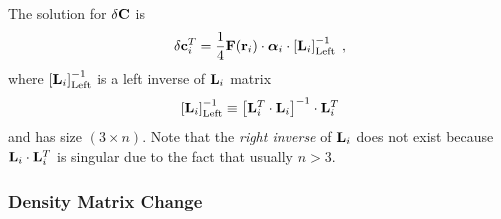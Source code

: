 \documentclass[aip,amsmath,amssymb,reprint,floatfix]{revtex4-1}
\newcommand{\BM}[1]{\bm{#1}}
\begin{document}
%
The solution for $\delta {\bf C}$ is
%
\begin{equation} \label{e:mu-ind.matrix.linear.solution}
  \delta {\bf c}_i^T = \frac{1}{4}
            {\bf F}({\bf r}_i)  \cdot {\BM{\alpha}}_i \cdot 
                    \left[ {\bf L}_i  \right]^{-1}_{\rm Left} \;,
\end{equation}
%
where $\left[ {\bf L}_i  \right]^{-1}_{\rm Left}$ is a left inverse
of ${\bf L}_i$ matrix 
%
\begin{equation} 
      \left[ {\bf L}_i  \right]^{-1}_{\rm Left}   \equiv
       \left[ {\bf L}_i^T \cdot {\bf L}_i \right]^{-1} \cdot {\bf L}_i^T 
\end{equation}
%
and has size $(3\times n)$. Note that the \emph{right inverse} of ${\bf L}_i$
does not exist because ${\bf L}_i \cdot {\bf L}_i^T$ is singular due to the fact that usually
$n > 3$.

\subsubsection{Density Matrix Change}
\end{document}
